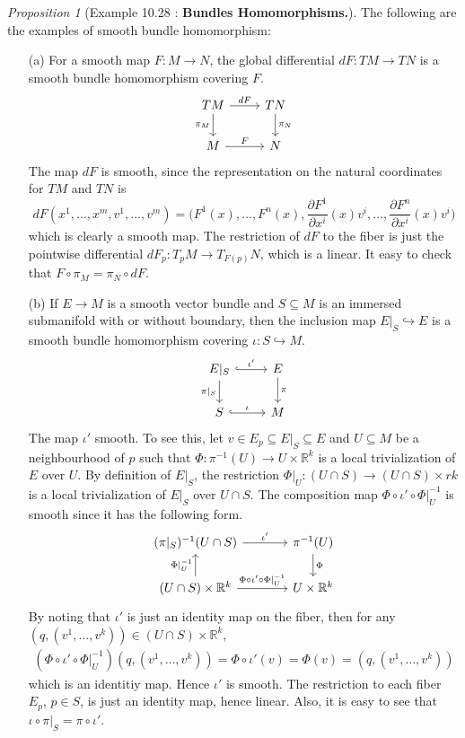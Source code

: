 \documentclass[a4paper]{article}
\theoremstyle{remark}
\newtheorem{prop}{Proposition}
\newcommand{\rk}{\mathbb{R}^k} %
\newcommand{\doo}{\partial}    %
\newcommand{\subhim}{\subseteq} %
\begin{document}
\begin{prop}[Example 10.28 : \textbf{Bundles Homomorphisms.}] The following are the examples of smooth bundle homomorphism:

\begin{enumerate}[nolistsep]
\item[(a)] For a smooth map $F : M \to N$, the global differential $dF : TM \to TN$ is a smooth bundle homomorphism covering $F$.
\[
\begin{tikzcd}
TM \arrow[r,"dF"] \arrow[d,"\pi_M",swap] & TN \arrow[d,"\pi_N"] \\
M \arrow[r,"F"] & N
\end{tikzcd}
\]
The map $dF$ is smooth, since the representation on the natural coordinates for $TM$ and $TN$ is
$$
dF (x^1,\dots,x^m,v^1,\dots,v^m) = \Big( F^1(x),\dots,F^n(x), \frac{\doo F^1}{\doo x^i}(x) v^i, \dots, \frac{\doo F^n}{\doo x^i}(x) v^i \Big)
$$
which is clearly a smooth map. The restriction of $dF$ to the fiber is just the pointwise differential $dF_p : T_pM \to T_{F(p)} N$, which is a linear. It easy to check that $F \circ \pi_M = \pi_N \circ dF$.

\item[(b)] If $E \to M$ is a smooth vector bundle and $S \subhim M$ is an immersed submanifold with or without boundary, then the inclusion map $E|_S \hookrightarrow E$ is a smooth bundle homomorphism covering $\iota : S \hookrightarrow M$.
\[
\begin{tikzcd}
E|_S \arrow[r,"\iota'",hook] \arrow[d,"\pi|_S",swap] & E \arrow[d,"\pi"] \\
S \arrow[r,"\iota",hook] & M
\end{tikzcd}
\]
The map $\iota'$ smooth. To see this, let $v \in E_p \subhim E|_S \subhim E$ and $U \subhim M$ be a neighbourhood of $p$ such that $\Phi : \pi^{-1} (U) \to U \times \rk$ is a local trivialization of $E$ over $U$. By definition of $E|_S$,  the restriction $\Phi|_U : (U \cap S) \to (U\cap S)\times rk$ is a local trivialization of $E|_S$ over $U \cap S$. The composition map $\Phi \circ \iota' \circ \Phi|_U^{-1}$ is smooth since it has the following form.
\[
\begin{tikzcd}[column sep=large]
(\pi|_S)^{-1}(U\cap S) \arrow[r,"\iota'"] & \pi^{-1}(U) \arrow[d,"\Phi"] \\
(U \cap S) \times \rk \arrow[u,"\Phi|_U^{-1}"] \arrow[r,"\Phi \circ \iota' \circ \Phi|_U^{-1}"] & U \times \rk
\end{tikzcd}
\]  
By noting that $\iota'$ is just an identity map on the fiber, then for any $(q,(v^1,\dots,v^k) ) \in (U \cap S) \times \rk$,
\begin{align*}
(\Phi \circ \iota' \circ \Phi|_U^{-1}) (q,(v^1,\dots,v^k)) = \Phi \circ \iota' (v) = \Phi (v) = (q,(v^1,\dots,v^k))
\end{align*}
which is an identitiy map. Hence $\iota'$ is smooth. The restriction to each fiber $E_p$, $p \in S$, is just an identity map, hence linear. Also, it is easy to see that $\iota \circ  \pi|_S = \pi \circ \iota'$. 
\end{enumerate}
\end{prop}
\end{document}

